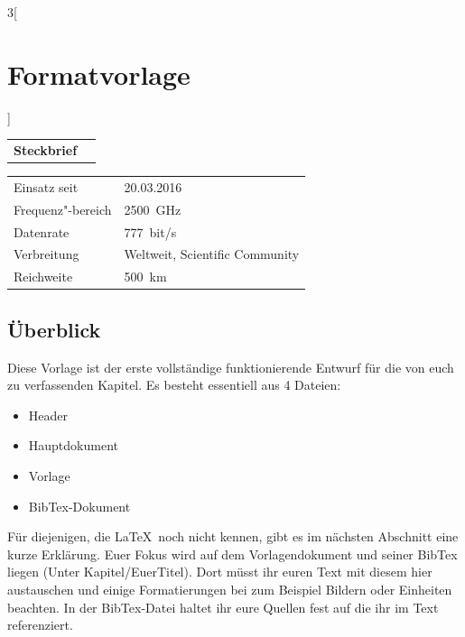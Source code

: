 \begin{multicols}{3}[\section{Formatvorlage}]


\newrefsegment

\begin{tabular}{p{}p{2.7 cm}}
\textbf{Steckbrief}& \\
\end{tabular}
\begin{tabular}{p{}p{2.7 cm}}
      Einsatz seit & 20.03.2016\\
      Frequenz"-bereich  & \SI{2500}{\giga\hertz}\\
      Datenrate & \SI{777}{bit/s}\\
      Verbreitung & Weltweit, Scientific Community\\
      Reichweite & \SI{500}{\kilo\metre}\\
\end{tabular}
\par
\subsection*{Überblick}
Diese Vorlage ist der erste vollständige funktionierende Entwurf für die von euch zu verfassenden Kapitel. Es besteht essentiell aus 4 Dateien:
\begin{itemize}
	\item Header
	\item Hauptdokument
	\item Vorlage
	\item BibTex-Dokument
\end{itemize}

Für diejenigen, die \LaTeX~noch nicht kennen, gibt es im nächsten Abschnitt eine kurze Erklärung. Euer Fokus wird auf dem Vorlagendokument und seiner BibTex liegen (Unter Kapitel/EuerTitel). Dort müsst ihr euren Text mit diesem hier austauschen und einige Formatierungen bei zum Beispiel Bildern oder Einheiten beachten. In der BibTex-Datei haltet ihr eure Quellen fest auf die ihr im Text referenziert. 


\end{multicols}
